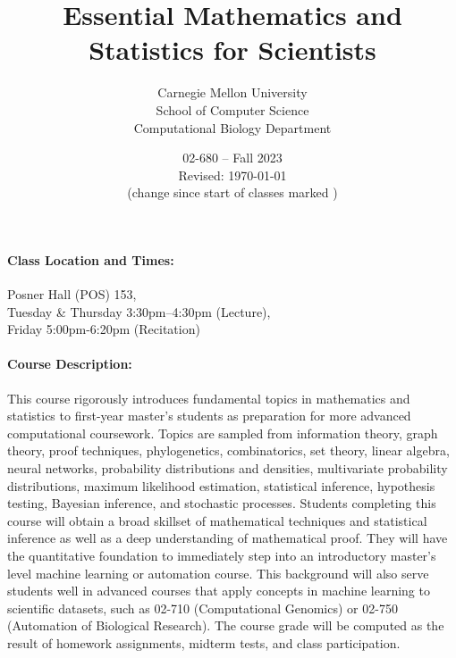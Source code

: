 \documentclass[12pt]{scrartcl}
\title{\large Essential Mathematics and Statistics for Scientists}\let\Title\@title
\subtitle{
{\small
Carnegie Mellon University\\
School of Computer Science\\
Computational Biology Department
}
\vskip-1cm}
\date{\large 02-680 -- Fall 2023\\ \vspace{1em}\small Revised: \today\\(change since start of classes marked \change{}{in orange})}
\begin{document}

\maketitle





\paragraph{Class Location and Times:} Posner Hall (POS) 153,\\
\hspace*{3em}Tuesday \& Thursday 3:30pm--4:30pm (Lecture), \\
\hspace*{3em}Friday 5:00pm-6:20pm (Recitation)


\paragraph{Course Description:} 
This course rigorously introduces fundamental topics in mathematics and statistics 
to first-year master's students as preparation for more advanced computational coursework. 
Topics are sampled from information theory, graph theory, proof techniques, phylogenetics, 
combinatorics, set theory, linear algebra, neural networks, probability distributions and densities, 
multivariate probability distributions, maximum likelihood estimation, statistical inference, hypothesis testing, 
Bayesian inference, and stochastic processes. 
Students completing this course will obtain a broad skillset of mathematical techniques and 
statistical inference as well as a deep understanding of mathematical proof. 
They will have the quantitative foundation to immediately step into 
an introductory master's level machine learning or automation course. 
This background will also serve students well in advanced courses that apply concepts in 
machine learning to scientific datasets, such as 
02-710 (Computational Genomics) or 02-750 (Automation of Biological Research). 
The course grade will be computed as the result of homework assignments, midterm tests, and class participation.
\end{document}
